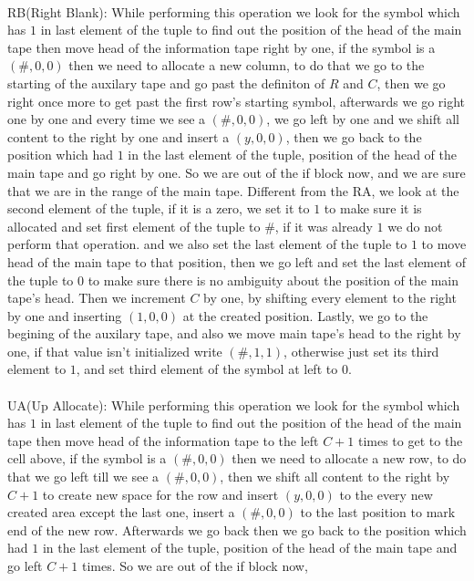 \documentclass[12pt]{article}
\begin{document}
\\
RB(Right Blank): While performing this operation we look for the symbol which has $1$ in
last element of the tuple to find out the position of the head of the main tape then move head 
of the information tape right by one, if the symbol is a $(\#,0,0)$
then we need to allocate a new column, to do that we go to the starting of the auxilary tape
and go past the definiton of $R$ and $C$, then we go right once more to get past the first row's
starting symbol, afterwards we go right one by one and
every time we see a $(\#,0,0)$, we go left by one and we shift all content to the right by one and insert a
$(y,0,0)$, then we go back to the position which had $1$ in the last element of the tuple,
position of the head of the main tape and go right by one. So we are out of the if block now,
and we are sure that we are in the range of the main tape. Different from the RA, we look at the
second element of the tuple, if it is a zero, we set it to $1$ to make sure it is allocated
and set first element of the tuple to $\#$, if it was already $1$ we do not perform that operation.
and we also set the last element of the tuple to $1$ to move head of the main tape to that position,
then we go left and set the last element of the tuple to $0$ to make sure there is no ambiguity about
the position of the main tape's head. Then we increment $C$ by one, by shifting every element to the right
by one and inserting $(1,0,0)$ at the created position. Lastly, we go to the begining of the auxilary tape, and also we move 
main tape's head to the right by one, if that value isn't initialized write $(\#,1,1)$, otherwise
just set its third element to $1$, and set third element of the symbol at left to $0$.\\
\\
UA(Up Allocate): While performing this operation we look for the symbol which has $1$ in
last element of the tuple to find out the position of the head of the main tape then move head 
of the information tape to the left $C+1$ times to get to the cell above, if the symbol is a $(\#,0,0)$
then we need to allocate a new row, to do that we go left till we see a $(\#,0,0)$, then 
we shift all content to the right by $C+1$ to create new space for the row and insert $(y,0,0)$ to the
every new created area except the last one, insert a $(\#,0,0)$ to the last position to mark end of the new row.
Afterwards we go back then we go back to the position which had $1$ in the last element of the tuple,
position of the head of the main tape and go left $C+1$ times. So we are out of the if block now,
\end{document}
